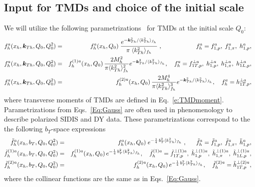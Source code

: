 \documentclass[a4paper]{article}
\newcommand{\ba}{\begin{eqnarray}}
\newcommand{\ea}{\end{eqnarray}}
\newcommand{\la}{\langle}
\newcommand{\ra}{\rangle}
\def\kTh{\bm k_{Th}}
\def\avkTh{\la k_{Th}^2 \ra}
\begin{document}
\subsection{
Input for TMDs and choice of the initial scale }
\label{sec-2.3}
We will utilize the following parametrizations~\cite{Bastami:2018xqd}
for TMDs at the initial scale $Q_0$:
\ba
f_{h}^a(x_h,\kTh,Q_0,Q_0^2) &=& 
f_{h}^a(x_h,Q_0) \; \frac{e^{- \kTh^2 / \avkTh_{f_{h}}  }}{\pi \; \avkTh_{f_{h}} }\; , 
\quad \hspace{16mm}
f_{h}^a = f_{1, p}^a, \; f_{1, \pi}^a,\; h_{1, p}^a, \nonumber\\
f_{h}^{a}(x_h,\kTh,Q_0,Q_0^2) &=&  
f_{h}^{(1) a}(x_h,Q_0) \, \frac{2 M_h^2}{\pi \avkTh_{f_{h}}^2} e^{-\kTh^2/{\avkTh_{f_{h}}}}, 
\quad
f_h^a = f_{1T, p}^{\perp a},\;h_{1, p}^{\perp a},\;h_{1, \pi}^{\perp a},\;h_{1L, p}^{\perp a},\nonumber\\
f_{h}^{a}(x_h,\kTh,Q_0,Q_0^2) &=&  
f_{h}^{(2) a}(x_h,Q_0) \, \frac{2 M_h^4}{\pi \avkTh_{f_{h}}^3} e^{-\kTh^2/{\avkTh_{f_{h}}}}, 
\quad
f_h^a = h_{1T, p}^{\perp a}, \label{Eq:Gauss}
\ea
where transverse moments of TMDs are defined in Eq.~\eqref{e:TMDmoment}. Parametrizations from Eqs.~\eqref{Eq:Gauss} are often used in phenomenology to describe polarized SIDIS and DY data. 
These parametrizations correspond to the the following $b_T$-space expressions
\ba
\tilde f_{h}^a(x_h,b_T,Q_0,Q_0^2) &=& 
f_{h}^a(x_h,Q_0) \;  e^{- \frac{1}{4} \, b_T^2 \avkTh_{f_{h}}} \; , 
\quad \hspace{2mm}
\tilde f_{h}^{a} = \tilde f_{1, p}^a, \; \tilde f_{1, \pi}^a,\; \tilde h_{1, p}^a, \nonumber\\
\tilde f_{h}^{(1) a}(x_h,b_T,Q_0,Q_0^2) &=&  
f_{h}^{(1) a}(x_h,Q_0) \,  e^{-\frac{1}{4} \, b_T^2 {\avkTh_{f_{h}}}}, 
\quad
\tilde f_h^{(1)a} = \tilde f_{1T, p}^{\perp (1) a},\;\tilde h_{1, p}^{\perp (1) a},\;\tilde h_{1, \pi}^{\perp (1) a},\;\tilde h_{1L, p}^{\perp (1) a},\nonumber\\
\tilde f_{h}^{(2) a}(x_h,b_T,Q_0,Q_0^2) &=&  
f_{h}^{(2) a}(x_h,Q_0) \,  e^{-\frac{1}{4} \, b_T^2{\avkTh_{f_{h}}}}, 
\quad
\tilde f_h^{(2)a} = \tilde h_{1T, p}^{\perp (2) a}, \label{Eq:Gaussb}
\ea
where the collinear functions are the same as in Eqs.~\eqref{Eq:Gauss}.
\end{document}
